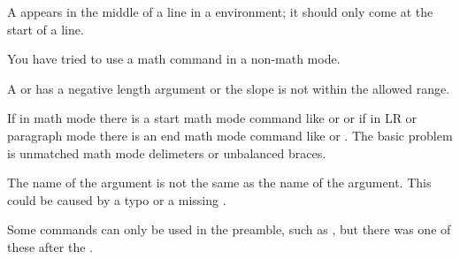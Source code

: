 \begin{plainlist}

\item[] 

    A \cmd{\<} appears in the middle of a line in a  environment;
it should only come at the start of a line.

\item[] 

    You have tried to use a math command in a non-math mode.



\item[] 

    A \cmd{\line} or \cmd{\vector} has a negative length argument or
the slope is not within the allowed range.

\item[] 

    If in math mode there is a start math mode command like \cmd{\(}
or \cmd{\[} or if in LR or paragraph mode there is an end math mode
command like \cmd{\)}or \cmd{\]}. The basic problem is unmatched math
mode delimeters or unbalanced braces.

\item[] 

    The name of the \cmd{\begin} argument is not the same as the
name of the \cmd{\end} argument. This could be caused by a typo or a missing
\cmd{\end}.


\item[] 

    Some commands can only be used in the preamble, such
as \cmd{\usepackage}, but
there was one of these after the .


\item[] 


\end{plainlist}
